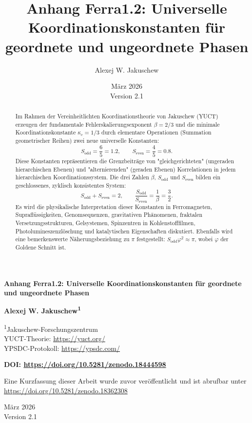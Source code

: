 \documentclass[12pt,a4paper]{article}
\title{Anhang Ferra1.2: Universelle Koordinationskonstanten für geordnete und ungeordnete Phasen}
\author{Alexej W. Jakuschew}
\date{März 2026 \\ Version 2.1}
\begin{document}
	
	\begin{titlepage}
		\begin{center}
			\vspace*{1cm}
			\Huge\textbf{Anhang Ferra1.2: Universelle Koordinationskonstanten für geordnete und ungeordnete Phasen}
			\vspace{1cm}
			
			\Large\textbf{Alexej W. Jakuschew\textsuperscript{1}}
			\vspace{0.5cm}
			
			\large
			\textsuperscript{1}Jakuschew-Forschungszentrum \\
			YUCT-Theorie: \url{https://yuct.org/} \\
			YPSDC-Protokoll: \url{https://ypsdc.com/}
			\vspace{1cm}
			
			\textbf{DOI: \url{https://doi.org/10.5281/zenodo.18444598}}
			\vspace{1cm}
			
			\large
			Eine Kurzfassung dieser Arbeit wurde zuvor veröffentlicht und ist abrufbar unter \\
			\url{https://doi.org/10.5281/zenodo.18362308}
			\vspace{1cm}
			
			\large
			März 2026 \\ \large Version 2.1
			\vspace{1cm}
			
			\begin{minipage}{0.9\textwidth}
				\begin{abstract}
					\noindent
					Im Rahmen der Vereinheitlichten Koordinationstheorie von Jakuschew (YUCT) erzeugen der fundamentale Fehlerskalierungsexponent \(\beta = 2/3\) und die minimale Koordinationskonstante \(\kappa_c = 1/3\) durch elementare Operationen (Summation geometrischer Reihen) zwei neue universelle Konstanten:
					\[
					S_{\text{odd}} = \frac{6}{5}=1.2,\qquad S_{\text{even}} = \frac{4}{5}=0.8.
					\]
					Diese Konstanten repräsentieren die Grenzbeiträge von "gleichgerichteten" (ungeraden hierarchischen Ebenen) und "alternierenden" (geraden Ebenen) Korrelationen in jedem hierarchischen Koordinationssystem. Die drei Zahlen \(\beta\), \(S_{\text{odd}}\) und \(S_{\text{even}}\) bilden ein geschlossenes, zyklisch konsistentes System:
					\[
					S_{\text{odd}}+S_{\text{even}} = 2,\qquad \frac{S_{\text{odd}}}{S_{\text{even}}} = \frac{1}{\beta} = \frac{3}{2}.
					\]
					Es wird die physikalische Interpretation dieser Konstanten in Ferromagneten, Supraflüssigkeiten, Genomsequenzen, gravitativen Phänomenen, fraktalen Versetzungsstrukturen, Gelsystemen, Spinzentren in Kohlenstofffilmen, Photolumineszenzlöschung und katalytischen Eigenschaften diskutiert. Ebenfalls wird eine bemerkenswerte Näherungsbeziehung zu \(\pi\) festgestellt: \(S_{\text{odd}}\varphi^2 \approx \pi\), wobei \(\varphi\) der Goldene Schnitt ist. 
					

\end{abstract}
\end{minipage}
\end{center}
\end{titlepage}
\end{document}
